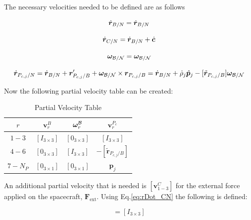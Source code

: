 The necessary velocities needed to be defined are as follows

\begin{equation}
	\dot{\bm r}_{B/N} = \dot{\bm r}_{B/N}\\
\end{equation}

\begin{equation}
	\dot{\bm r}_{C/N} = \dot{\bm r}_{B/N} + \dot{\bm c}\\
	\label{eq:rDot_CN}
\end{equation}

\begin{equation}
	\bm \omega_{\cal{B/N}} = \bm \omega_{\cal{B/N}}
\end{equation}

\begin{equation}
	\dot{\bm r}_{P_{c,j}/N} = \dot{\bm r}_{B/N} + {\bm r}'_{P_{c,j}/B} + \bm \omega_{\cal{B/N}} \times {\bm r}_{P_{c,j}/B} = \dot{\bm r}_{B/N} + \dot{\rho}_j \hat{\bm p}_j  - [\tilde{{\bm r}}_{P_{c,j}/B}] \bm \omega_{\cal{B/N}}
\end{equation}

Now the following partial velocity table can be created:

\begin{table}[htbp]
	\caption{Partial Velocity Table}
	\label{tab:hub}
	\centering \fontsize{10}{10}\selectfont
	\begin{tabular}{ c | c | c | c } %
		\hline
		$r$  & $\bm v^B_{r}$  & $\bm \omega_{\textit{r}}^{\cal{B}}$ & $\bm v^{P_c}_{r}$ \\
		\hline
		$1-3$  & $[I_{3\times 3}]$ & $[0_{3\times 3}]$ & $[I_{3\times 3}]$ \\
		$4-6$ & $[0_{3\times 3}]$ & $[I_{3\times 3}]$ & $- [\tilde{{\bm r}}_{P_{c,j}/B}]$ \\
		$7-{N_P}$ &$[0_{3\times 1}]$ & $[0_{3\times 1}]$ & $\hat{\bm p}_j$ \\
		\hline
	\end{tabular}
\end{table}

An additional partial velocity that is needed is $[\bm v^C_{1-3}]$ for the external force applied on the spacecraft, $\bm F_{\text{ext}}$. Using Eq.\eqref{eq:rDot_CN} the following is defined:

\begin{equation}
	[\bm v^C_{1-3}] = [I_{3\times 3}]
\end{equation}

